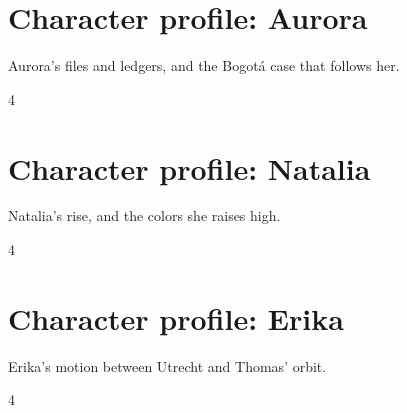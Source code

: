 \documentclass[a4paper,landscape]{memoir}
\begin{document}
\chapter{Character profile: Aurora}
Aurora's files and ledgers, and the Bogot\'a case that follows her.
\clearpage\begin{multicols*}{4}















\end{multicols*}

\chapter{Character profile: Natalia}
Natalia's rise, and the colors she raises high.
\clearpage\begin{multicols*}{4}









\end{multicols*}

\chapter{Character profile: Erika}
Erika's motion between Utrecht and Thomas' orbit.
\clearpage\begin{multicols*}{4}








\end{multicols*}
\end{document}
